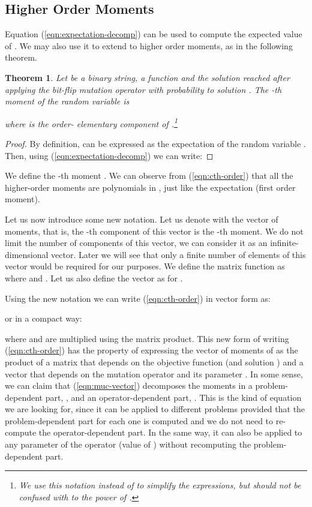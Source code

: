 \documentclass{article}
\newtheorem{theorem}{Theorem}
\begin{document}
\subsection{Higher Order Moments}
\label{subsec:higher-moments}

Equation (\ref{eqn:expectation-decomp}) can be used to compute the expected value of . We may also use it to extend to higher order moments, as in the following theorem. 
\begin{theorem}
Let  be a binary string,  a function and  the solution reached after applying the bit-flip mutation operator with probability  to solution . The -th moment of the random variable  is

where  is the order- elementary component of .\footnote{We use this notation instead of  to simplify the expressions, but  should not be confused with  to the power of .}
\end{theorem}
\begin{proof}
By definition,  can be expressed as the expectation of the random variable . Then, using (\ref{eqn:expectation-decomp}) we can write:

\end{proof}

We define the -th moment . We can observe from (\ref{eqn:cth-order}) that all the higher-order moments are polynomials in , just like the expectation (first order moment). 

Let us now introduce some new notation. Let us denote with  the vector of moments, that is, the -th component of this vector is the -th moment. We do not limit the number of components of this vector, we can consider it as an infinite-dimensional vector. Later we will see that only a finite number of elements of this vector would be required for our purposes. We define the matrix function  as  where  and . Let us also define the vector  as  for . 

Using the new notation we can write (\ref{eqn:cth-order}) in vector form as:

or in a compact way:

where  and  are multiplied using the matrix product. This new form of writing (\ref{eqn:cth-order}) has the property of expressing the vector of moments of  as the product of a matrix that depends on the objective function (and solution ) and a vector that depends on the mutation operator and its parameter . In some sense, we can claim that (\ref{eqn:muc-vector}) decomposes the moments in a problem-dependent part, , and an operator-dependent part, . This is the kind of equation we are looking for, since it can be applied to different problems provided that the problem-dependent part for each one is computed and we do not need to re-compute the operator-dependent part. In the same way, it can also be applied to any parameter of the operator (value of ) without recomputing the problem-dependent part. 
\end{document}
